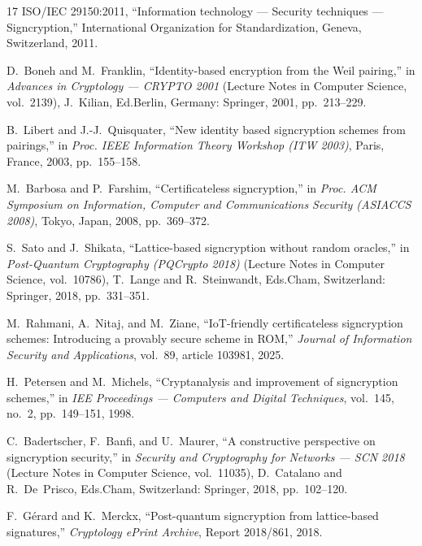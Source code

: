 \documentclass[conference]{IEEEtran}
\begin{document}
\begin{thebibliography}{17}
ISO/IEC 29150:2011, ``Information technology --- Security techniques --- Signcryption,'' International Organization for Standardization, Geneva, Switzerland, 2011.

D.~Boneh and M.~Franklin, ``Identity-based encryption from the Weil pairing,'' in \textit{Advances in Cryptology --- CRYPTO 2001} (Lecture Notes in Computer Science, vol.~2139), J.~Kilian, Ed.\hspace{1em}Berlin, Germany: Springer, 2001, pp.~213--229.

B.~Libert and J.-J.~Quisquater, ``New identity based signcryption schemes from pairings,'' in \textit{Proc. IEEE Information Theory Workshop (ITW 2003)}, Paris, France, 2003, pp.~155--158.

M.~Barbosa and P.~Farshim, ``Certificateless signcryption,'' in \textit{Proc. ACM Symposium on Information, Computer and Communications Security (ASIACCS 2008)}, Tokyo, Japan, 2008, pp.~369--372.

S.~Sato and J.~Shikata, ``Lattice-based signcryption without random oracles,'' in \textit{Post-Quantum Cryptography (PQCrypto 2018)} (Lecture Notes in Computer Science, vol.~10786), T.~Lange and R.~Steinwandt, Eds.\hspace{1em}Cham, Switzerland: Springer, 2018, pp.~331--351.

M.~Rahmani, A.~Nitaj, and M.~Ziane, ``IoT-friendly certificateless signcryption schemes: Introducing a provably secure scheme in ROM,'' \textit{Journal of Information Security and Applications}, vol.~89, article 103981, 2025.

H.~Petersen and M.~Michels, ``Cryptanalysis and improvement of signcryption schemes,'' in \textit{IEE Proceedings --- Computers and Digital Techniques}, vol.~145, no.~2, pp.~149--151, 1998.

C.~Badertscher, F.~Banfi, and U.~Maurer, ``A constructive perspective on signcryption security,'' in \textit{Security and Cryptography for Networks --- SCN 2018} (Lecture Notes in Computer Science, vol.~11035), D.~Catalano and R.~De~Prisco, Eds.\hspace{1em}Cham, Switzerland: Springer, 2018, pp.~102--120.

F.~G\'{e}rard and K.~Merckx, ``Post-quantum signcryption from lattice-based signatures,'' \textit{Cryptology ePrint Archive}, Report 2018/861, 2018.

\end{thebibliography}
\end{document}
